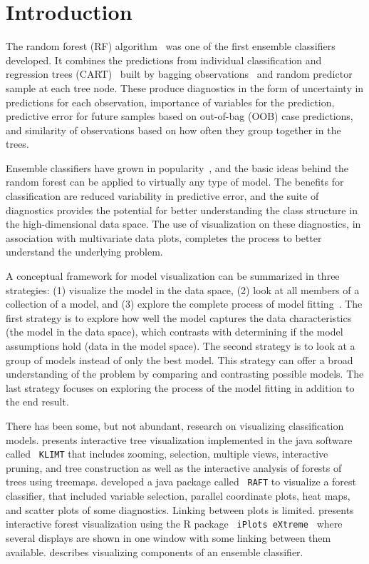 \documentclass[smallextended,natbib]{svjour3}\usepackage[]{graphicx}\usepackage[]{xcolor}
\begin{document}
\newpage

\section{Introduction}
\label{sec:intro}

The random forest (RF) algorithm~\citep{breiman1996bagging} was one of the first ensemble classifiers developed. It combines the predictions from individual classification and regression trees (CART)~\citep{breiman1984cl} built by bagging observations~\citep{breiman1996bagging} and random predictor sample at each tree node. These produce diagnostics in the form of uncertainty in predictions for each observation, importance of variables for the prediction, predictive error for future samples based on out-of-bag (OOB) case predictions, and similarity of observations based on how often they group together in the trees.

Ensemble classifiers have grown in popularity~\citep{dietterish00, talbot09}, and the basic ideas behind the random forest can be applied to virtually any type of model. The benefits for classification are reduced variability in predictive error, and the suite of diagnostics provides the potential for better understanding the class structure in the high-dimensional data space. The use of visualization on these diagnostics, in association with multivariate data plots, completes the process to better understand the underlying problem.

A conceptual framework for model visualization can be summarized in three strategies: (1) visualize the model in the data space, (2) look at all members of a collection of a model, and (3) explore the complete process of model fitting~\citep{wickham2015visualizing}. The first strategy is to explore how well the model captures the data characteristics (the model in the data space), which contrasts with determining if the model assumptions hold (data in the model space). The second strategy is to look at a group of models instead of only the best model. This strategy can offer a broad understanding of the problem by comparing and contrasting possible models. The last strategy focuses on exploring the process of the model fitting in addition to the end result.

There has been some, but not abundant, research on visualizing classification models.
\cite{urbanek2002exploring} presents interactive tree visualization implemented in the java software called \verb# KLIMT# that includes zooming, selection, multiple views, interactive pruning, and tree construction as well as the interactive analysis of forests of trees using treemaps. \cite{cutler15raft} developed a java package called \verb# RAFT# to visualize a forest classifier, that included variable selection, parallel coordinate plots, heat maps, and scatter plots of some diagnostics. Linking between plots is limited. \cite{quach2012interactive} presents interactive forest visualization using the R package \verb# iPlots eXtreme # \citep{urbanek2011iplots} where several displays are shown in one window with some linking between them available. \cite{Silva2016} describes visualizing components of an ensemble classifier.
\end{document}
